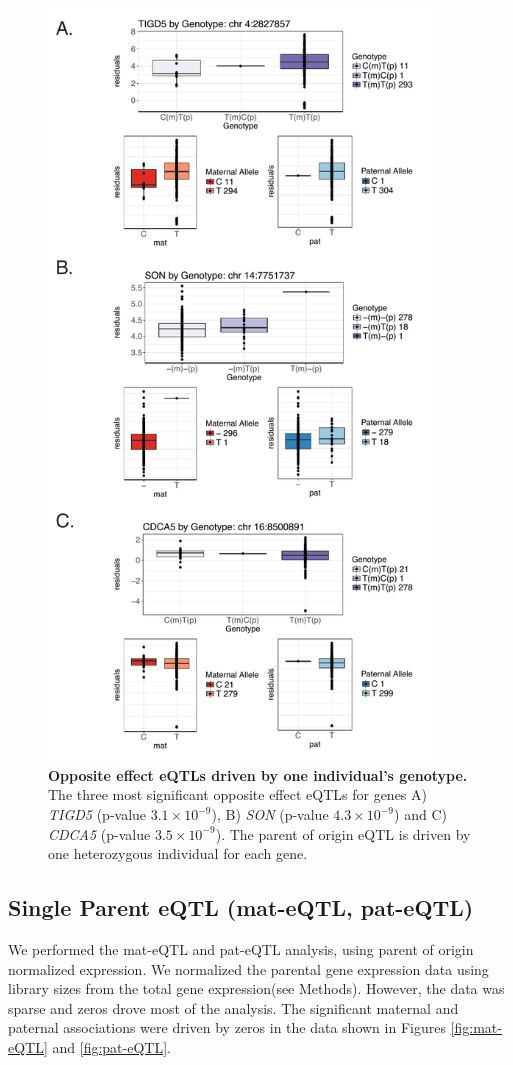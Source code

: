 \begin{figure}[!htb]
\centering \includegraphics[width=4in]{img/ch04/fig-01-oeQTLs.pdf}
\caption[Opposite effect eQTLs driven by one individual's genotype.]{\textbf{Opposite effect eQTLs driven by one individual's genotype.} The three most significant opposite effect eQTLs for genes A) \emph{TIGD5} (p-value $ 3.1 \times 10^{-9} $), B) \emph{SON} (p-value $4.3 \times 10^{-9} $) and C) \emph{CDCA5} (p-value $3.5 \times 10^{-9} $). The parent of origin eQTL is driven by one heterozygous individual for each gene.}
\label{fig:oeQTL}
\end{figure}
\clearpage

\subsection{Single Parent eQTL (mat-eQTL, pat-eQTL)}\label{Single Parent eQTL (mat-eQTL, pat-eQTL)} 
We performed the mat-eQTL and pat-eQTL analysis, using parent of origin normalized expression. We normalized the parental gene expression data using library sizes from the total gene expression(see Methods). However, the data was sparse and zeros drove most of the analysis. The significant maternal and paternal associations were driven by zeros in the data shown in Figures \ref{fig:mat-eQTL} and \ref{fig:pat-eQTL}. 

